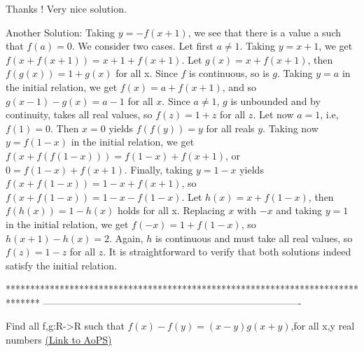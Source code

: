 \begin{solution}
	Thanks ! Very nice solution.
\end{solution}



\begin{solution}
	Another Solution: Taking $ y = -f (x + 1) $, we see that there is a value a such that $ f (a) = 0 $. We
consider two cases.
Let first  $ a≠1 $. Taking $ y = x + 1 $, we get $ f (x + f (x + 1)) = x + 1 + f (x + 1) $. Let $
g(x) = x + f (x + 1) $, then $ f (g(x)) = 1 + g(x) $ for all x. Since $ f $ is continuous, so is $ g $.
Taking $ y = a $ in the initial relation, we get $ f (x) = a+ f (x +1) $, and so $ g(x -1)- g(x) =
a - 1 $ for all $ x $. Since $ a ≠ 1 $, $ g $ is unbounded and by continuity, takes all real values, so $ 
f (z) = 1 + z $ for all $ z $.
Let now $ a = 1 $, i.e, $ f (1) = 0 $. Then $ x = 0 $ yields $ f ( f (y)) = y  $ for all reals $ y $. Taking now $
y = f (1 - x) $ in the initial relation, we get $ f (x + f ( f (1 - x))) = f (1 - x) + f (x + 1) $,
or $ 0 = f (1 - x) + f (x + 1) $. Finally, taking $ y = 1 - x $ yields $ f (x + f (1 - x)) = 1 - x + f (x + 1) $, so $ f (x + f (1 - x)) = 1 - x - f (1 - x) $. Let $ h(x) = x + f (1 - x) $, then $
f (h(x)) = 1 - h(x) $ holds for all x. Replacing $ x $ with $ -x $ and taking $ y = 1 $ in the initial
relation, we get $ f (-x) = 1 + f (1 - x) $, so $ h(x + 1) - h(x) = 2 $. Again, $ h $ is continuous
and must take all real values, so $ f (z) = 1- z $ for all $ z $.
It is straightforward to verify that both solutions indeed satisfy the initial relation.
\end{solution}
*******************************************************************************
-------------------------------------------------------------------------------

\begin{problem}
	Find all f,g:R->R such that $f(x)-f(y)=(x-y)g(x+y)$,for all x,y real numbers
	\flushright \href{https://artofproblemsolving.com/community/c6h578806}{(Link to AoPS)}
\end{problem}



